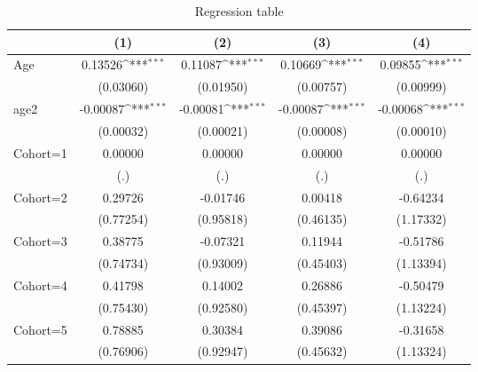 \begin{table}[htbp]\centering
\def\sym#1{\ifmmode^{#1}\else\(^{#1}\)\fi}
\caption{Regression table \label{reg2}}
\begin{tabular}{l*{4}{c}}
\toprule
                    &\multicolumn{1}{c}{(1)}         &\multicolumn{1}{c}{(2)}         &\multicolumn{1}{c}{(3)}         &\multicolumn{1}{c}{(4)}         \\
\midrule
Age                 &     0.13526\sym{***}&     0.11087\sym{***}&     0.10669\sym{***}&     0.09855\sym{***}\\
                    &   (0.03060)         &   (0.01950)         &   (0.00757)         &   (0.00999)         \\
\addlinespace
age2                &    -0.00087\sym{***}&    -0.00081\sym{***}&    -0.00087\sym{***}&    -0.00068\sym{***}\\
                    &   (0.00032)         &   (0.00021)         &   (0.00008)         &   (0.00010)         \\
\addlinespace
Cohort=1            &     0.00000         &     0.00000         &     0.00000         &     0.00000         \\
                    &         (.)         &         (.)         &         (.)         &         (.)         \\
\addlinespace
Cohort=2            &     0.29726         &    -0.01746         &     0.00418         &    -0.64234         \\
                    &   (0.77254)         &   (0.95818)         &   (0.46135)         &   (1.17332)         \\
\addlinespace
Cohort=3            &     0.38775         &    -0.07321         &     0.11944         &    -0.51786         \\
                    &   (0.74734)         &   (0.93009)         &   (0.45403)         &   (1.13394)         \\
\addlinespace
Cohort=4            &     0.41798         &     0.14002         &     0.26886         &    -0.50479         \\
                    &   (0.75430)         &   (0.92580)         &   (0.45397)         &   (1.13224)         \\
\addlinespace
Cohort=5            &     0.78885         &     0.30384         &     0.39086         &    -0.31658         \\
                    &   (0.76906)         &   (0.92947)         &   (0.45632)         &   (1.13324)         \\

\end{tabular}
\end{table}
